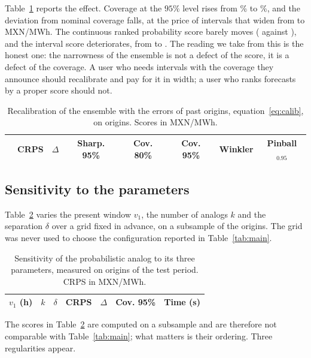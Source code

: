 \documentclass[12pt,a4paper]{article}
\begin{document}
Table~\ref{tab:calibration} reports the effect. Coverage at the $95\%$ level
rises from \CALCOVRAW\% to \CALCOV\%, and the deviation from nominal coverage
falls, at the price of intervals that widen from \CALSHARPRAW{} to
\CALSHARP{} MXN/MWh. The continuous ranked probability score barely moves
(\CALCRPSRAW{} against \CALCRPS{}), and the interval score deteriorates, from
\CALWINKRAW{} to \CALWINK{}. The reading we take from this is the honest one:
the narrowness of the ensemble is not a defect of the score, it is a defect of
the coverage. A user who needs intervals with the coverage they announce
should recalibrate and pay for it in width; a user who ranks forecasts by a
proper score should not.

\begin{table}[htbp]
\centering
\caption{Recalibration of the ensemble with the errors of past origins,
equation~\eqref{eq:calib}, on \NCAL{} origins. Scores in MXN/MWh.}
\label{tab:calibration}
\small
\begin{tabular}{lccccccc}
\toprule
& CRPS & $\Delta$ & Sharp. 95\% & Cov. 80\% & Cov. 95\% & Winkler & Pinball$_{0.95}$ \\
\midrule

\bottomrule
\end{tabular}
\end{table}

\subsection{Sensitivity to the parameters}
\label{sec:sens}

Table~\ref{tab:sensitivity} varies the present window $v_1$, the number of
analogs $k$ and the separation $\delta$ over a grid fixed in advance, on a
subsample of the origins. The grid was never used to choose the configuration
reported in Table~\ref{tab:main}.

\begin{table}[htbp]
\centering
\caption{Sensitivity of the probabilistic analog to its three parameters,
measured on \NSENS{} origins of the test period. CRPS in MXN/MWh.}
\label{tab:sensitivity}
\small
\begin{tabular}{ccccccc}
\toprule
$v_1$ (h) & $k$ & $\delta$ & CRPS & $\Delta$ & Cov. 95\% & Time (s) \\
\midrule

\bottomrule
\end{tabular}
\end{table}

The scores in Table~\ref{tab:sensitivity} are computed on a subsample and are
therefore not comparable with Table~\ref{tab:main}; what matters is their
ordering. Three regularities appear.
\end{document}
